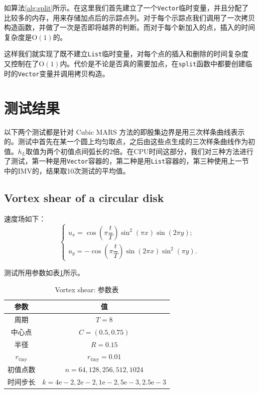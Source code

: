 \documentclass[a4paper,twoside]{ctexart}
\begin{document}
如算法\ref{alg:split}所示。在这里我们首先建立了一个\texttt{Vector}临时变量，并且分配了比较多的内存，用来存储加点后的示踪点列。对于每个示踪点我们调用了一次拷贝构造函数，并做了一次是否即将越界的判断。而对于每个新加入的点，插入的时间复杂度是$\mathrm{O}(1)$的。

这样我们就实现了既不建立\texttt{List}临时变量，对每个点的插入和删除的时间复杂度又控制在了$\mathrm{O}(1)$内。代价是不论是否真的需要加点，在\texttt{split}函数中都要创建临时的\texttt{Vector}变量并调用拷贝构造。

\section{测试结果}
以下两个测试都是针对 Cubic MARS 方法的即殷集边界是用三次样条曲线表示的。测试中首先在某一个圆上均匀取点，之后由这些点生成的三次样条曲线作为初值。$h_L$取值为两个初值点间弧长的$2$倍。在CPU时间这部分，我们对三种方法进行了测试，第一种是用\texttt{Vector}容器的，第二种是用\texttt{List}容器的，第三种使用上一节中的IMV的，结果取10次测试的平均值。
\subsection{Vortex shear of a circular disk}
速度场如下：
\begin{equation}
  \left\{
  \begin{array}{l}
    u_x=\cos\left(\pi \dfrac{t}{T}\right)\sin^2(\pi x)\sin(2\pi y);\\
    u_y=-\cos\left(\pi \dfrac{t}{T}\right)\sin(2\pi x)\sin^2(\pi y).
  \end{array}
  \right.
\end{equation}  

测试所用参数如表\ref{tab:vortex1}所示。
\begin{table}[htbp]
    \centering\begin{tabular}{c|c}
        \hline
        参数&值\\
        \hline
        周期&$T=8$\\
        中心点&$C=(0.5,0.75)$\\
        半径&$R=0.15$\\
        $r_{\mathrm{tiny}}$&$r_{\mathrm{tiny}}=0.01$\\
        初值点数&$n=64,128,256,512,1024$\\
        时间步长&$k=4\mathrm{e}-2,2\mathrm{e}-2,1\mathrm{e}-2,5\mathrm{e}-3,2.5\mathrm{e}-3$\\
        \hline
    \end{tabular}
    \caption{Vortex shear: 参数表}
    \label{tab:vortex1}
\end{table}
\end{document}
